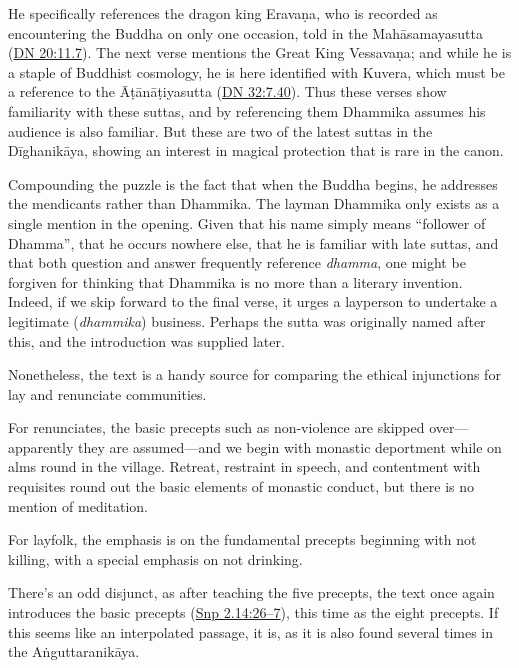 \documentclass[12pt,openany]{book}%
\begin{document}
He specifically references the dragon king \textsanskrit{Eravaṇa}, who is recorded as encountering the Buddha on only one occasion, told in the \textsanskrit{Mahāsamayasutta} (\href{https://suttacentral.net/dn20/en/sujato\#11.7}{DN 20:11.7}). The next verse mentions the Great King \textsanskrit{Vessavaṇa}; and while he is a staple of Buddhist cosmology, he is here identified with Kuvera, which must be a reference to the \textsanskrit{Āṭānāṭiyasutta} (\href{https://suttacentral.net/dn32/en/sujato\#7.40}{DN 32:7.40}). Thus these verses show familiarity with these suttas, and by referencing them Dhammika assumes his audience is also familiar. But these are two of the latest suttas in the \textsanskrit{Dīghanikāya}, showing an interest in magical protection that is rare in the canon.

Compounding the puzzle is the fact that when the Buddha begins, he addresses the mendicants rather than Dhammika. The layman Dhammika only exists as a single mention in the opening. Given that his name simply means “follower of Dhamma”, that he occurs nowhere else, that he is familiar with late suttas, and that both question and answer frequently reference \textit{dhamma}, one might be forgiven for thinking that Dhammika is no more than a literary invention. Indeed, if we skip forward to the final verse, it urges a layperson to undertake a legitimate (\textit{dhammika}) business. Perhaps the sutta was originally named after this, and the introduction was supplied later.

Nonetheless, the text is a handy source for comparing the ethical injunctions for lay and renunciate communities.

For renunciates, the basic precepts such as non-violence are skipped over—apparently they are assumed—and we begin with monastic deportment while on alms round in the village. Retreat, restraint in speech, and contentment with requisites round out the basic elements of monastic conduct, but there is no mention of meditation.

For layfolk, the emphasis is on the fundamental precepts beginning with not killing, with a special emphasis on not drinking.

There’s an odd disjunct, as after teaching the five precepts, the text once again introduces the basic precepts (\href{https://suttacentral.net/snp2.14/en/sujato\#26}{Snp 2.14:26–7}), this time as the eight precepts. If this seems like an interpolated passage, it is, as it is also found several times in the \textsanskrit{Aṅguttaranikāya}.
\end{document}

